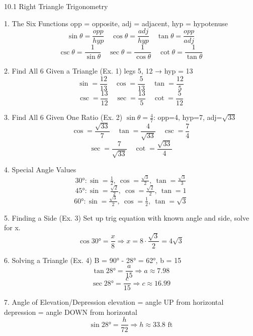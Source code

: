 10.1 Right Triangle Trigonometry

1. The Six Functions
opp = opposite, adj = adjacent, hyp = hypotenuse
$$ \sin\theta=\frac{opp}{hyp} \quad \cos\theta=\frac{adj}{hyp} \quad \tan\theta=\frac{opp}{adj} $$
$$ \csc\theta=\frac{1}{\sin\theta} \quad \sec\theta=\frac{1}{\cos\theta} \quad \cot\theta=\frac{1}{\tan\theta} $$

2. Find All 6 Given a Triangle (Ex. 1)
legs 5, 12 → hyp = 13
$$ \sin=\frac{12}{13} \quad \cos=\frac{5}{13} \quad \tan=\frac{12}{5} $$
$$ \csc=\frac{13}{12} \quad \sec=\frac{13}{5} \quad \cot=\frac{5}{12} $$

3. Find All 6 Given One Ratio (Ex. 2)
$\sin\theta = \frac{4}{7}$: opp=4, hyp=7, adj=$\sqrt{33}$
$$ \cos=\frac{\sqrt{33}}{7} \quad \tan=\frac{4}{\sqrt{33}} \quad \csc=\frac{7}{4} $$
$$ \sec=\frac{7}{\sqrt{33}} \quad \cot=\frac{\sqrt{33}}{4} $$

4. Special Angle Values
$$ 30°: \sin=\tfrac{1}{2},\ \cos=\tfrac{\sqrt{3}}{2},\ \tan=\tfrac{\sqrt{3}}{3} $$
$$ 45°: \sin=\tfrac{\sqrt{2}}{2},\ \cos=\tfrac{\sqrt{2}}{2},\ \tan=1 $$
$$ 60°: \sin=\tfrac{\sqrt{3}}{2},\ \cos=\tfrac{1}{2},\ \tan=\sqrt{3} $$

5. Finding a Side (Ex. 3)
Set up trig equation with known angle and side, solve for x.
$$ \cos 30°=\frac{x}{8} \Rightarrow x=8\cdot\frac{\sqrt{3}}{2}=4\sqrt{3} $$

6. Solving a Triangle (Ex. 4)
B = 90° - 28° = 62°, b = 15
$$ \tan 28°=\frac{a}{15} \Rightarrow a\approx 7.98 $$
$$ \sec 28°=\frac{c}{15} \Rightarrow c\approx 16.99 $$

7. Angle of Elevation/Depression
elevation = angle UP from horizontal
depression = angle DOWN from horizontal
$$ \sin 28°=\frac{h}{72} \Rightarrow h\approx 33.8 \text{ ft} $$
